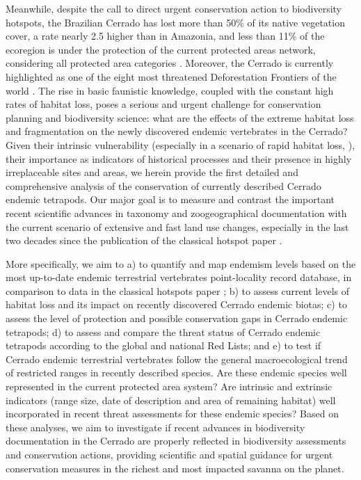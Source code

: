 \documentclass[12pt,openright,oneside,a4paper,english]{abntex2}
\begin{document}
Meanwhile, despite the call to direct urgent conservation action to biodiversity hotspots, the Brazilian Cerrado has lost more than 50\% of its native vegetation cover, a rate nearly 2.5 higher than in Amazonia, and less than 11\% of the ecoregion is under the protection of the current protected areas network, considering all protected area categories \citep{UNEP-IUCN-PAs, Strassburg2017, VieiraAlencar2023}. Moreover, the Cerrado is currently highlighted as one of the eight most threatened Deforestation Frontiers of the world \citep{Pacheco2021}. The rise in basic faunistic knowledge, coupled with the constant high rates of habitat loss, poses a serious and urgent challenge for conservation planning and biodiversity science: what are the effects of the extreme habitat loss and fragmentation on the newly discovered endemic vertebrates in the Cerrado? Given their intrinsic vulnerability (especially in a scenario of rapid habitat loss, \citealp[see][]{Strassburg2017}), their importance as indicators of historical processes and their presence in highly irreplaceable sites and areas, we herein provide the first detailed and comprehensive analysis of the conservation of currently described Cerrado endemic tetrapods. Our major goal is to measure and contrast the important recent scientific advances in taxonomy and zoogeographical documentation with the current scenario of extensive and fast land use changes, especially in the last two decades since the publication of the classical hotspot paper \citep{Myers2000}. 

More specifically, we aim to a) to quantify and map endemism levels based on the most up-to-date endemic terrestrial vertebrates point-locality record database, in comparison to data in the classical hotspots paper \citep{Myers2000}; b) to assess current levels of habitat loss and its impact on recently discovered Cerrado endemic biotas; c) to assess the level of protection and possible conservation gaps in Cerrado endemic tetrapods; d) to assess and compare the threat status of Cerrado endemic tetrapods according to the global and national Red Lists; and e) to test if Cerrado endemic terrestrial vertebrates follow the general macroecological trend of restricted ranges in recently described species. Are these endemic species well represented in the current protected area system? Are intrinsic and extrinsic indicators (range size, date of description and area of remaining habitat) well incorporated in recent threat assessments for these endemic species? Based on these analyses, we aim to investigate if recent advances in biodiversity documentation in the Cerrado are properly reflected in biodiversity assessments and conservation actions, providing scientific and spatial guidance for urgent conservation measures in the richest and most impacted savanna on the planet.
\end{document}
